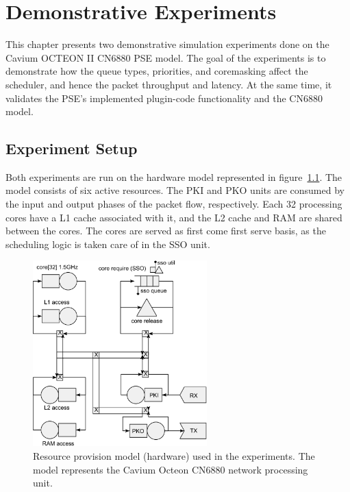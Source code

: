 \chapter{Demonstrative Experiments}
\label{chapter:demonstrative-experiments}

This chapter presents two demonstrative simulation experiments done on the Cavium OCTEON II CN6880 PSE model. The goal of the experiments is to demonstrate how the queue types, priorities, and coremasking affect the scheduler, and hence the packet throughput and latency. At the same time, it validates the PSE's implemented plugin-code functionality and the CN6880 model.

\section{Experiment Setup}
\label{sec:experiment-setup}

Both experiments are run on the hardware model represented in figure~\ref{fig:experiment-hardware}. The model consists of six active resources. The PKI and PKO units are consumed by the input and output phases of the packet flow, respectively. Each 32 processing cores have a L1 cache associated with it, and the L2 cache and RAM are shared between the cores. The cores are served as first come first serve basis, as the scheduling logic is taken care of in the SSO unit.

\begin{figure}[]
  \begin{center}
    \includegraphics[width=0.6\textwidth]{images/pse-models/experiment-hardware.pdf}
    \caption{Resource provision model (hardware) used in the experiments. The model represents the Cavium Octeon CN6880 network processing unit.}
    \label{fig:experiment-hardware}
  \end{center}
\end{figure}

